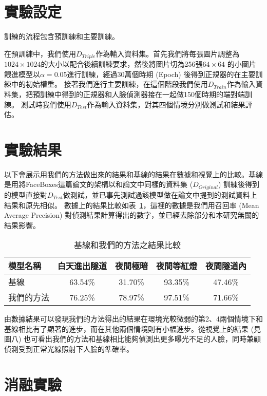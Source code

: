 \section{實驗設定}

訓練的流程包含預訓練和主要訓練。

在預訓練中，我們使用$D_{Triple}$作為輸入資料集。首先我們將每張圖片調整為 $1024 \times 1024$的大小以配合後續訓練要求，然後將圖片切為256張$64 \times 64$ 的小圖片餵進模型以$\alpha = 0.05$進行訓練，經過30萬個時期 (Epoch) 後得到正規器的在主要訓練中的初始權重。
接著我們進行主要訓練，在這個階段我們使用$D_{Train}$作為輸入資料集，把預訓練中得到的正規器和人臉偵測器接在一起做150個時期的端對端訓練。
測試時我們使用$D_{Test}$作為輸入資料集，對其四個情境分別做測試和結果評估。

\section{實驗結果}

以下會展示用我們的方法做出來的結果和基線的結果在數據和視覺上的比較。基線是用將FaceBoxes這篇論文的架構以和論文中同樣的資料集 ($D_{Original}$) 訓練後得到的模型直接對$D_{Test}$做測試，並已事先測試過該模型做在論文中提到的測試資料上結果和原先相似。
數據上的結果比較如表~\ref{table:baseline_compare}，這裡的數據是我們用召回率 (Mean Average Precision) 對偵測結果計算得出的數字，並已經去除部分和本研究無關的結果影響。
\begin{table}[ht]
    \caption{基線和我們的方法之結果比較}
    \centering
    \begin{tabular}{l c c c c}
        \hline
        模型名稱 & 白天進出隧道 & 夜間極暗 & 夜間等紅燈 & 夜間隧道內 \\
        \hline
        基線 & 63.54\% & 31.70\% & 93.35\% & 47.46\% \\
        我們的方法 & 76.25\% & 78.97\% & 97.51\% & 71.66\% \\
        \hline
    \end{tabular}
    \label{table:baseline_compare}
\end{table}

由數據結果可以發現我們的方法得出的結果在環境光較微弱的第2、4兩個情境下和基線相比有了顯著的進步，而在其他兩個情境則有小幅進步。從視覺上的結果 (見圖八) 也可看出我們的方法和基線相比能夠偵測出更多曝光不足的人臉，同時兼顧偵測受到正常光線照射下人臉的準確率。

\section{消融實驗}

